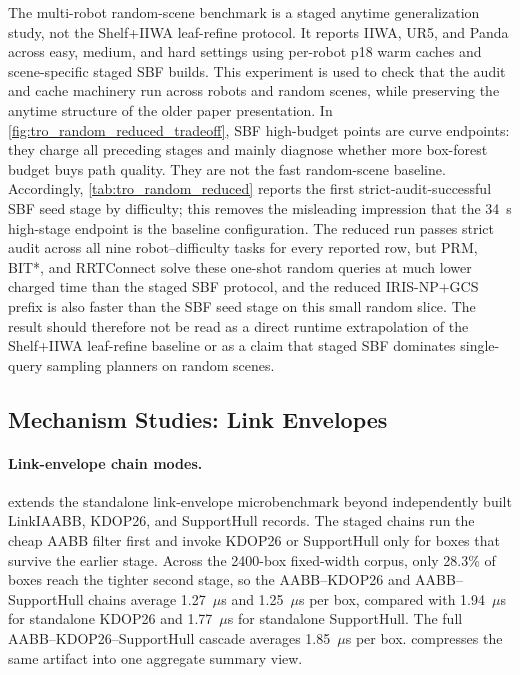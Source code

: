 The multi-robot random-scene benchmark is a staged anytime generalization study,
not the Shelf+IIWA leaf-refine protocol. It reports IIWA, UR5, and Panda across
easy, medium, and hard settings using per-robot p18 warm caches and
scene-specific staged SBF builds. This experiment is used to check that the
audit and cache machinery run across robots and random scenes, while preserving
the anytime structure of the older paper presentation. In
\cref{fig:tro_random_reduced_tradeoff}, SBF high-budget points are curve
endpoints: they charge all preceding stages and mainly diagnose whether more
box-forest budget buys path quality. They are not the fast random-scene
baseline. Accordingly, \cref{tab:tro_random_reduced} reports the first
strict-audit-successful SBF seed stage by difficulty; this removes the
misleading impression that the 34~s high-stage endpoint is the baseline
configuration. The reduced run passes strict audit across all nine
robot--difficulty tasks for every reported row, but PRM, BIT*, and RRTConnect
solve these one-shot random queries at much lower charged time than the staged
SBF protocol, and the reduced IRIS-NP+GCS prefix is also faster than the SBF
seed stage on this small random slice. The result should therefore not be read
as a direct runtime extrapolation of the Shelf+IIWA leaf-refine baseline or as a
claim that staged SBF dominates single-query sampling planners on random
scenes.

\subsection{Mechanism Studies: Link Envelopes}\label{sec:exp_mechanisms}



\paragraph{Link-envelope chain modes.}
 extends the standalone link-envelope
microbenchmark beyond independently built LinkIAABB, KDOP26, and SupportHull
records. The staged chains run the cheap AABB filter first and invoke KDOP26 or
SupportHull only for boxes that survive the earlier stage. Across the 2400-box
fixed-width corpus, only 28.3\% of boxes reach the tighter second stage, so the
AABB--KDOP26 and AABB--SupportHull chains average 1.27~$\mu$s and
1.25~$\mu$s per box, compared with 1.94~$\mu$s for standalone KDOP26 and
1.77~$\mu$s for standalone SupportHull. The full AABB--KDOP26--SupportHull
cascade averages 1.85~$\mu$s per box. 
compresses the same artifact into one aggregate summary view.

